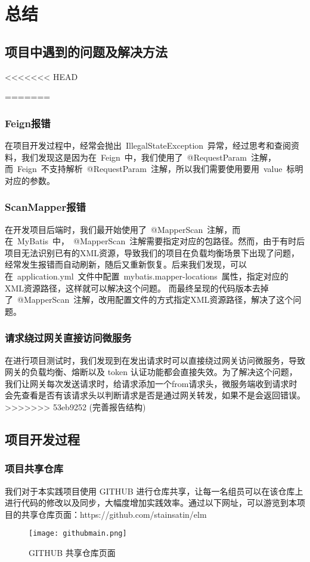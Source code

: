 \chapter{总结}
\section{项目中遇到的问题及解决方法}
<<<<<<< HEAD

=======
\subsection{Feign报错}
在项目开发过程中，经常会抛出~IllegalStateException~异常，经过思考和查阅资料，我们发现这是因为在~Feign~中，我们使用了~@RequestParam~注解，而~Feign~不支持解析~@RequestParam~注解，所以我们需要使用要用~value~标明对应的参数。

\subsection{ScanMapper报错}
在开发项目后端时，我们最开始使用了~@MapperScan~注解，而在~MyBatis~中，~@MapperScan~注解需要指定对应的包路径。然而，由于有时后项目无法识别已有的XML资源，导致我们的项目在负载均衡场景下出现了问题，经常发生报错而自动刷新，随后又重新恢复。后来我们发现，可以在~application.yml~文件中配置~mybatis.mapper-locations~属性，指定对应的XML资源路径，这样就可以解决这个问题。
而最终呈现的代码版本去掉了~@MapperScan~注解，改用配置文件的方式指定XML资源路径，解决了这个问题。

\subsection{请求绕过网关直接访问微服务}
在进行项目测试时，我们发现到在发出请求时可以直接绕过网关访问微服务，导致网关的负载均衡、熔断以及 token 认证功能都会直接失效。为了解决这个问题，我们让网关每次发送请求时，给请求添加一个from请求头，微服务端收到请求时会先查看是否有该请求头以判断请求是否是通过网关转发，如果不是会返回错误。
>>>>>>> 53eb9252 (完善报告结构)

\section{项目开发过程}
\subsection{项目共享仓库}
我们对于本实践项目使用 GITHUB 进行仓库共享，让每一名组员可以在该仓库上进行代码的修改以及同步，大幅度增加实践效率。通过以下网址，可以游览到本项目的共享仓库页面：https://github.com/stainsatin/elm
\begin{figure}[htbp]
    \centering
    \texttt{[image: githubmain.png]}
    \caption{GITHUB 共享仓库页面}\label{fig:githubmain}
    \vspace{\baselineskip}
\end{figure}

